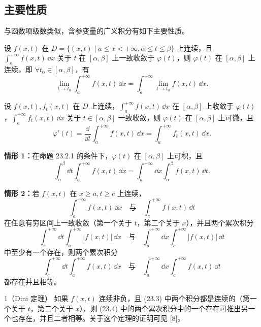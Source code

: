 \subsection{主要性质}
与函数项级数类似，含参变量的广义积分有如下主要性质。

\begin{xproposition}[23.2.1（连续性）]
设 $f(x,t)$ 在 $D=\{(x,t)\mid a\leqslant x<+\infty,\alpha\leqslant t\leqslant\beta\}$ 上连续，且 $\displaystyle\int_a^{+\infty}f(x,t)\,\dd x$ 关于 $t$ 在 $[\alpha,\beta]$ 上一致收敛于 $\varphi(t)$，则 $\varphi(t)$ 在 $[\alpha,\beta]$ 上连续，即 $\forall t_0\in[\alpha,\beta]$，有
\[
  \lim_{t\to t_0}\int_a^{+\infty}f(x,t)\,\dd x=\int_a^{+\infty}\lim_{t\to t_0}f(x,t)\,\dd x.
\]
\end{xproposition}

\begin{xproposition}[23.2.2（可微性）]
设 $f(x,t),f_t(x,t)$ 在 $D$ 上连续，$\displaystyle\int_a^{+\infty}f(x,t)\,\dd x$ 在 $[\alpha,\beta]$ 上收敛于 $\varphi(t)$，$\displaystyle\int_a^{+\infty}f_t(x,t)\,\dd x$ 关于 $t\in[\alpha,\beta]$ 一致收敛，则 $\varphi(t)$ 在 $[\alpha,\beta]$ 上可微，且
\[
  \varphi'(t)=\frac{\dd}{\dd t}\int_a^{+\infty}f(x,t)\,\dd x=\int_a^{+\infty}f_t(x,t)\,\dd x.
\]
\end{xproposition}

\begin{xproposition}[23.2.3（交换积分次序）]
\textbf{情形 1：}在命题 23.2.1 的条件下，$\varphi(t)$ 在 $[\alpha,\beta]$ 上可积，且
\[
  \int_\alpha^\beta\dd t\int_a^{+\infty}f(x,t)\,\dd x
  =\int_a^{+\infty}\dd x\int_\alpha^\beta f(x,t)\,\dd t.
\]

\textbf{情形 2：}若 $f(x,t)$ 在 $x\geqslant a,t\geqslant c$ 上连续，
\begin{equation}
  \int_a^{+\infty}f(x,t)\,\dd x\quad\text{与}\quad\int_c^{+\infty}f(x,t)\,\dd t
  \tag{23.3}
\end{equation}
在任意有穷区间上一致收敛（第一个关于 $t$，第二个关于 $x$），并且两个累次积分
\begin{equation}
  \int_c^{+\infty}\dd t\int_a^{+\infty}|f(x,t)|\,\dd x
  \quad\text{与}\quad
  \int_a^{+\infty}\dd x\int_c^{+\infty}|f(x,t)|\,\dd t
  \tag{23.4}
\end{equation}
中至少有一个存在，则两个累次积分
\[
  \int_c^{+\infty}\dd t\int_a^{+\infty}f(x,t)\,\dd x
  \quad\text{与}\quad
  \int_a^{+\infty}\dd x\int_c^{+\infty}f(x,t)\,\dd t
\]
都存在并且相等。
\end{xproposition}

\begin{xremark}
1（Dini 定理） 如果 $f(x,t)$ 连续非负，且 (23.3) 中两个积分都是连续的（第一个关于 $t$，第二个关于 $x$），则 (23.4) 中的两个累次积分中的一个存在可推出另一个也存在，并且二者相等。关于这个定理的证明可见 [8]。
\end{xremark}

